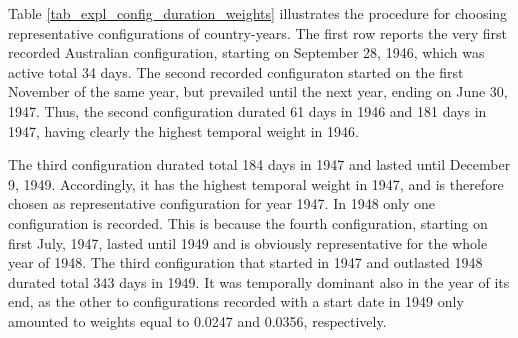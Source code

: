 Table \ref{tab_expl_config_duration_weights} illustrates the procedure for choosing representative configurations of country-years.
The first row reports the very first recorded Australian configuration, starting on September 28, 1946, which was active total 34 days. 
The second recorded configuraton started on the first November of the same year, but prevailed until the next year, ending on June 30, 1947. 
Thus, the second configuration durated 61 days in 1946 and 181 days in 1947, having clearly the highest temporal weight in 1946.

The third configuration durated total 184 days in 1947 and lasted until December 9, 1949. Accordingly, it has the highest temporal weight in 1947, and is therefore chosen as representative configuration for year 1947.%
In 1948 only one configuration is recorded. This is because the fourth configuration, starting on first July, 1947, lasted until 1949 and is obviously representative for the whole year of 1948. 
The third configuration that started in 1947 and outlasted 1948 durated total 343 days in 1949. 
It was temporally dominant also in the year of its end, as the other to configurations recorded with a start date in 1949 only amounted to weights equal to 0.0247 and 0.0356, respectively.

